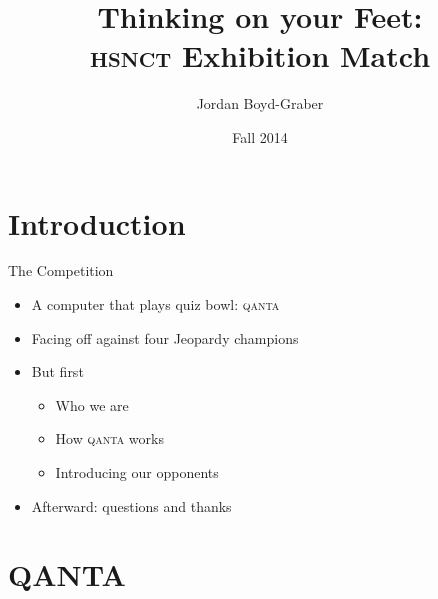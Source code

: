 \documentclass[compress]{beamer}
\title[Thinking on Your Feet]{Thinking on your Feet: \\ \textsc{hsnct} Exhibition Match}
\author{ Jordan Boyd-Graber}
\date{Fall 2014}
\institute[Boulder] %
{University of Colorado Boulder}
\begin{document}
\frame{
\titlepage
\tiny
}

\section{Introduction}

\begin{frame}{The Competition}

\begin{itemize}
	\item A computer that plays quiz bowl: \textsc{qanta}
	\item Facing off against four Jeopardy champions
	\pause
	\item But first
	\begin{itemize}
		\item Who we are
		\item How \textsc{qanta} works
		\item Introducing our opponents
	\end{itemize}
	\pause
	\item Afterward: questions and thanks
\end{itemize}

\end{frame}

\section{QANTA}
\end{document}

